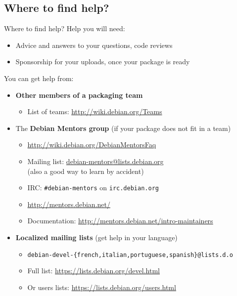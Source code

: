 \documentclass[10pt,final]{beamer}
\begin{document}
\subsection{Where to find help?}
\begin{frame}{Where to find help?}
	\hbr
  Help you will need:
  \begin{itemize}
  \item Advice and answers to your questions, code reviews
  \item Sponsorship for your uploads, once your package is ready
  \end{itemize}
  \hbr
  You can get help from:
  \begin{itemize}
	  \item \textbf{Other members of a packaging team}
    \begin{itemize}
    \item List of teams: \url{http://wiki.debian.org/Teams}
    \end{itemize}
    \hbr
  \item The \textbf{Debian Mentors group} (if your package does not fit in a team)
    \begin{itemize}
    \item \url{http://wiki.debian.org/DebianMentorsFaq}
    \item Mailing list: \url{debian-mentors@lists.debian.org}\\
	    {\small (also a good way to learn by accident)}
    \item IRC: \texttt{\#debian-mentors} on \texttt{irc.debian.org}
    \item \url{http://mentors.debian.net/}
    \item Documentation: \url{http://mentors.debian.net/intro-maintainers}
    \end{itemize}
    \hbr
  \item \textbf{Localized mailing lists} (get help in your language)
    \begin{itemize}
  \item \texttt{debian-devel-\{french,italian,portuguese,spanish\}@lists.d.o}
  \item Full list: \url{https://lists.debian.org/devel.html}
  \item Or users lists: \url{https://lists.debian.org/users.html}
  \end{itemize}
  \end{itemize}
\end{frame}
\end{document}
